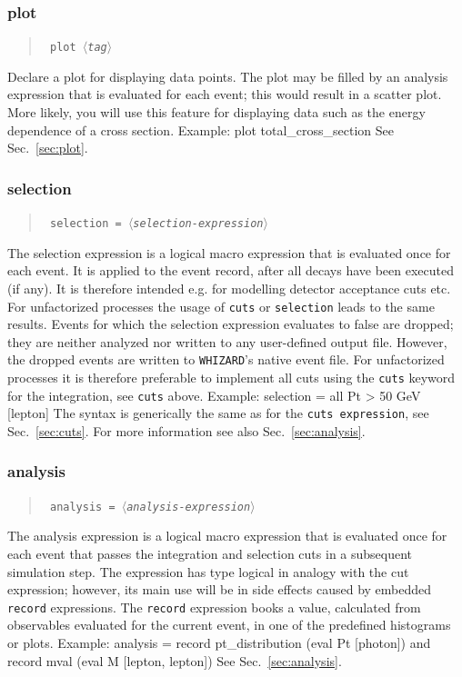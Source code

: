 \documentclass[12pt]{book}
\newenvironment{code}%
  {\begingroup\footnotesize
   \quote
   \Verbatim}%
  {\endVerbatim
   \endquote
   \endgroup\noindent}
\newenvironment{syntax}%
  {\begin{quote}
   \begin{flushleft}\tt}%
  {\end{flushleft}
   \end{quote}}
\newcommand{\var}[1]{$\langle$\textit{#1}$\rangle$}
\newcommand{\ttt}[1]{\texttt{#1}}
\newcommand{\whizard}{\ttt{WHIZARD}}
\begin{document}
\subsubsection{plot}
\begin{syntax}
plot \var{tag}
\end{syntax}
Declare a plot for displaying data points.  The plot may be filled by an
analysis expression that is evaluated for each event; this would result in a
scatter plot.  More likely, you will use this feature for displaying data such
as the energy dependence of a cross section.  Example:
\begin{code}
plot total_cross_section
\end{code}
See Sec.~\ref{sec:plot}.


\subsubsection{selection}
\begin{syntax}
selection = \var{selection-expression}
\end{syntax}
The selection expression is a logical macro expression that is evaluated once
for each event. It is applied to the event record,
after all decays have been executed (if any). It is therefore intended
e.g. for modelling detector acceptance cuts etc. For unfactorized
processes the usage of \ttt{cuts} or \ttt{selection} leads to
the same results. Events for which the selection expression evaluates
to false are dropped; they are neither analyzed nor written to any
user-defined output file. However, the dropped events are written to
\whizard's native event file. For unfactorized processes it is
therefore preferable to implement all cuts using the \ttt{cuts}
keyword for the integration, see \ttt{cuts} above.
Example:
\begin{code}
selection = all Pt > 50 GeV [lepton]
\end{code}
The syntax is generically the same as for the \ttt{cuts
expression}, see Sec.~\ref{sec:cuts}. For more information see also
Sec.~\ref{sec:analysis}.


\subsubsection{analysis}
\begin{syntax}
analysis = \var{analysis-expression}
\end{syntax}
The analysis expression is a logical macro expression that is evaluated once
for each event that passes the integration and selection cuts in a
subsequent simulation step.  The
expression has type logical in analogy with the cut expression; however, its
main use will be in side effects caused by embedded \ttt{record} expressions.
The \ttt{record} expression books a value, calculated from observables
evaluated for the current event, in one of the predefined histograms or plots.
Example:
\begin{code}
analysis = record pt_distribution (eval Pt [photon])
      and  record mval (eval M [lepton, lepton])
\end{code}
See Sec.~\ref{sec:analysis}.
\end{document}
